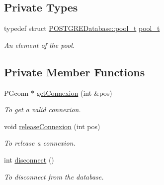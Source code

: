 \subsection*{Private Types}
\begin{DoxyCompactItemize}
\item 
\hypertarget{classPOSTGREDatabase_a48a0b798834146488a3626ea8af3acdb}{
typedef struct \hyperlink{structPOSTGREDatabase_1_1pool__t}{POSTGREDatabase::pool\_\-t} \hyperlink{classPOSTGREDatabase_a48a0b798834146488a3626ea8af3acdb}{pool\_\-t}}
\label{classPOSTGREDatabase_a48a0b798834146488a3626ea8af3acdb}

\begin{DoxyCompactList}\small\item\em An element of the pool. \item\end{DoxyCompactList}\end{DoxyCompactItemize}
\subsection*{Private Member Functions}
\begin{DoxyCompactItemize}
\item 
PGconn $\ast$ \hyperlink{classPOSTGREDatabase_adbea0ea18a50130d51b68dbaa86c1e89}{getConnexion} (int \&pos)
\begin{DoxyCompactList}\small\item\em To get a valid connexion. \item\end{DoxyCompactList}\item 
void \hyperlink{classPOSTGREDatabase_a6bc07c4256ea310f59b85bfc5803a340}{releaseConnexion} (int pos)
\begin{DoxyCompactList}\small\item\em To release a connexion. \item\end{DoxyCompactList}\item 
int \hyperlink{classPOSTGREDatabase_af026bcf159590b97226d829bddb8e00a}{disconnect} ()
\begin{DoxyCompactList}\small\item\em To disconnect from the database. \item\end{DoxyCompactList}\end{DoxyCompactItemize}
